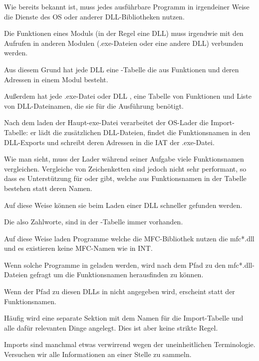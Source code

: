 \label{PE_exports_imports}
Wie bereits bekannt ist, muss jedes ausführbare Programm in irgendeiner Weise die
Dienste des \ac{OS} oder anderer DLL-Bibliotheken nutzen.

Die Funktionen eines Moduls (in der Regel eine DLL) muss irgendwie mit den Aufrufen
in anderen Modulen (.exe-Dateien oder eine andere DLL) verbunden werden.

Aus diesem Grund hat jede DLL eine -Tabelle die aus Funktionen und deren
Adressen in einem Modul besteht.

Außerdem hat jede .exe-Datei oder DLL , eine Tabelle von Funktionen und
Liste von DLL-Dateinamen, die sie für die Ausführung benötigt.

Nach dem laden der Haupt-exe-Datei verarbeitet der \ac{OS}-Lader die Import-Tabelle:
er lädt die zusätzlichen DLL-Dateien, findet die Funktionsnamen in den DLL-Exports
und schreibt deren Adressen in die \ac{IAT} der .exe-Datei.


Wie man sieht, muss der Lader während seiner Aufgabe viele Funktionsnamen vergleichen.
Vergleiche von Zeichenketten sind jedoch nicht sehr performant, so dass es Unterstützung
für  oder  gibt, welche aus Funktionsnamen in der Tabelle
bestehen statt deren Namen.

Auf diese Weise können sie beim Laden einer DLL schneller gefunden werden.

Die  also Zahlworte, sind in der -Tabelle immer vorhanden.

Auf diese Weise laden Programme welche die \ac{MFC}-Bibliothek nutzen die mfc*.dll
und es existieren keine \ac{MFC}-Namen wie in \ac{INT}.

Wenn solche Programme in \IDA geladen werden, wird nach dem Pfad zu den mfc*.dll-Dateien
gefragt um die Funktionsnamen herausfinden zu können.

Wenn der Pfad zu diesen DLLs in \IDA nicht angegeben wird, erscheint 
statt der Funktionsnamen.


Häufig wird eine separate Sektion mit dem Namen  für die Import-Tabelle
und alle dafür relevanten Dinge angelegt. Dies ist aber keine strikte Regel.

Imports sind manchmal etwas verwirrend wegen der uneinheitlichen Terminologie.
Versuchen wir alle Informationen an einer Stelle zu sammeln.

